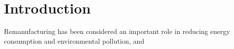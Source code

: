 \chapter{Introduction}
\label{chap: intro}
Remanufacturing has been considered an important role in reducing energy consumption and environmental pollution, and 